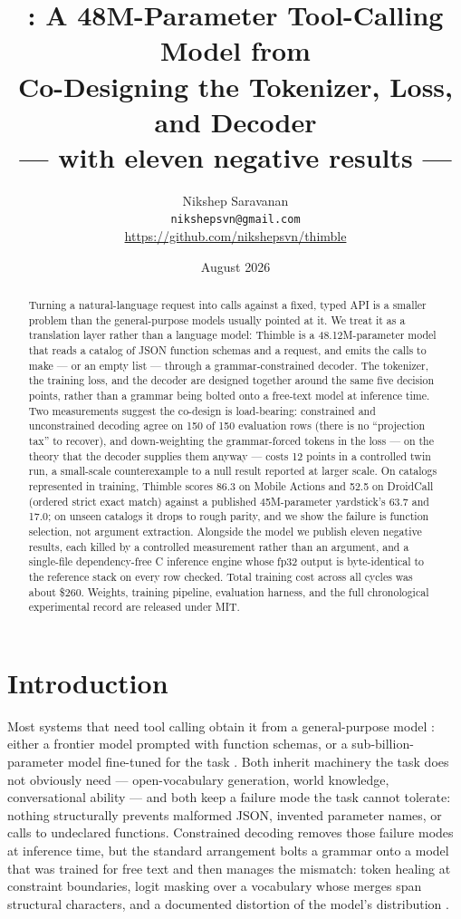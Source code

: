 \documentclass[10pt]{article}
\title{\textbf{\thimble{}: A 48M-Parameter Tool-Calling Model from\\
Co-Designing the Tokenizer, Loss, and Decoder\\
\large --- with eleven negative results ---}}
\author{Nikshep Saravanan\\
\small\texttt{nikshepsvn@gmail.com}\\
\small\url{https://github.com/nikshepsvn/thimble}}
\date{August 2026}
\newcommand{\thimble}{Thimble}
\begin{document}
\maketitle

\begin{abstract}
Turning a natural-language request into calls against a fixed, typed API is a
smaller problem than the general-purpose models usually pointed at it. We treat
it as a translation layer rather than a language model: \thimble{} is a
48.12M-parameter model that reads a catalog of JSON function schemas and a
request, and emits the calls to make --- or an empty list --- through a
grammar-constrained decoder. The tokenizer, the training loss, and the decoder
are designed together around the same five decision points, rather than a
grammar being bolted onto a free-text model at inference time. Two measurements
suggest the co-design is load-bearing: constrained and unconstrained decoding
agree on 150 of 150 evaluation rows (there is no ``projection tax'' to
recover), and down-weighting the grammar-forced tokens in the loss --- on the
theory that the decoder supplies them anyway --- costs 12 points in a
controlled twin run, a small-scale counterexample to a null result reported at
larger scale. On catalogs represented in training, \thimble{} scores 86.3 on
Mobile Actions and 52.5 on DroidCall (ordered strict exact match) against a
published 45M-parameter yardstick's 63.7 and 17.0; on unseen catalogs it drops
to rough parity, and we show the failure is function selection, not argument
extraction. Alongside the model we publish eleven negative results, each killed
by a controlled measurement rather than an argument, and a single-file
dependency-free C inference engine whose fp32 output is byte-identical to the
reference stack on every row checked. Total training cost across all cycles was
about \$260. Weights, training pipeline, evaluation harness, and the full
chronological experimental record are released under MIT.
\end{abstract}

\section{Introduction}

Most systems that need tool calling obtain it from a general-purpose model
\citep{toolformer,gorilla}: either a frontier model prompted with function
schemas, or a sub-billion-parameter model fine-tuned for the task
\citep{tinyagent,octopusv2,xlam}. Both inherit machinery the task does not
obviously need --- open-vocabulary generation, world knowledge, conversational
ability --- and both keep a failure mode the task cannot tolerate: nothing
structurally prevents malformed JSON, invented parameter names, or calls to
undeclared functions. Constrained decoding
\citep{gcd2023,domino,xgrammar,gad} removes those failure modes at inference
time, but the standard arrangement bolts a grammar onto a model that was
trained for free text and then manages the mismatch: token healing at
constraint boundaries, logit masking over a vocabulary whose merges span
structural characters, and a documented distortion of the model's distribution
\citep{gad,dccd}.
\end{document}
